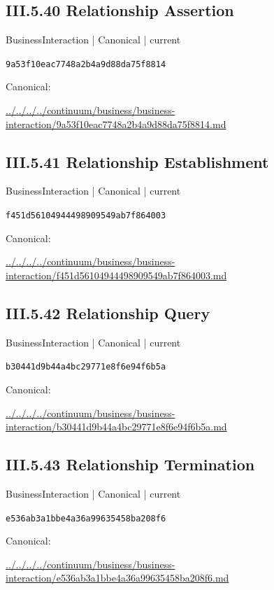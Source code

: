 \documentclass[10pt,a4paper]{article}
\begin{document}
\subsection*{III.5.40 Relationship Assertion}
\label{element-9a53f10eac7748a2b4a9d88da75f8814}
{\small BusinessInteraction | Canonical | current}\par
\texttt{9a53f10eac7748a2b4a9d88da75f8814}\par
Canonical: \par
{\footnotesize\url{../../../../continuum/business/business-interaction/9a53f10eac7748a2b4a9d88da75f8814.md}}\par
\subsection*{III.5.41 Relationship Establishment}
\label{element-f451d56104944498909549ab7f864003}
{\small BusinessInteraction | Canonical | current}\par
\texttt{f451d56104944498909549ab7f864003}\par
Canonical: \par
{\footnotesize\url{../../../../continuum/business/business-interaction/f451d56104944498909549ab7f864003.md}}\par
\subsection*{III.5.42 Relationship Query}
\label{element-b30441d9b44a4bc29771e8f6e94f6b5a}
{\small BusinessInteraction | Canonical | current}\par
\texttt{b30441d9b44a4bc29771e8f6e94f6b5a}\par
Canonical: \par
{\footnotesize\url{../../../../continuum/business/business-interaction/b30441d9b44a4bc29771e8f6e94f6b5a.md}}\par
\subsection*{III.5.43 Relationship Termination}
\label{element-e536ab3a1bbe4a36a99635458ba208f6}
{\small BusinessInteraction | Canonical | current}\par
\texttt{e536ab3a1bbe4a36a99635458ba208f6}\par
Canonical: \par
{\footnotesize\url{../../../../continuum/business/business-interaction/e536ab3a1bbe4a36a99635458ba208f6.md}}\par
\end{document}
